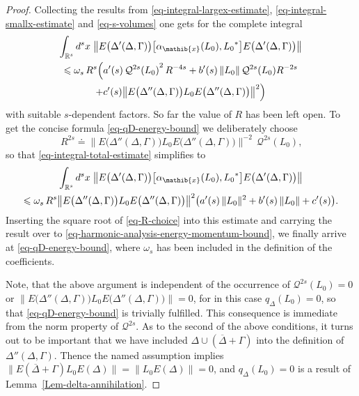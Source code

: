 \documentclass[11pt,twoside,openright]{report}
\theoremstyle{definition}
\theoremstyle{plain}
\theoremstyle{remark}
\theoremstyle{assumption}
\newcommand{\bcomm}[2]{\bigl[ #1 , #2 \bigr]}
\newcommand{\norm}[1]{\lVert #1 \rVert}
\newcommand{\bnorm}[1]{\bigl\lVert #1 \bigr\rVert}
\newcommand{\Qtwos}{\mathcal{Q}^{2 s}}
\newcommand{\Qtwosx}[1]{\mathcal{Q}^{2 s} ( #1 )}
\newcommand{\qDx}[1]{q_\Delta ( #1 )}
\newcommand{\Rs}{\mathbb{R}^s}
\newcommand{\Deltabar}{\overline{\Delta}}
\newcommand{\ED}{E ( \Delta )}
\newcommand{\EDG}{E \bigl( \Delta' ( \Delta , \Gamma ) \bigr)}
\newcommand{\EDdG}{E \bigl( \Delta'' ( \Delta , \Gamma ) \bigr)}
\newcommand{\EDGplus}{E ( \overline{\Delta} + \Gamma)}
\newcommand{\aibx}{\alpha_\mathib{x}}
\begin{document}
\begin{proof}
  Collecting the results from \eqref{eq-integral-largex-estimate},
  \eqref{eq-integral-smallx-estimate} and \eqref{eq-s-volumes} one
  gets for the complete integral
  \begin{multline}
    \label{eq-integral-total-estimate}
    \int_{\Rs} d^s x \; \bnorm{\EDG \bcomm{\aibx ( L_0 )}{{L_0}^*}
    \EDG} \\
    \leqslant \omega_s \, R^s \Bigl( a' ( s ) \, {\Qtwosx{L_0}}^2 \,
    R^{- 4 s} + b' ( s ) \, \norm{L_0} \, \Qtwosx{L_0} R^{- 2 s} \\
    + c' ( s ) \bnorm{\EDdG L_0 \EDdG}^2 \Bigr)
  \end{multline}
  with suitable $s$-dependent factors. So far the value of $R$ has
  been left open. To get the concise formula
  \eqref{eq-qD-energy-bound} we deliberately choose
  \begin{equation}
    \label{eq-R-choice}
    R^{2 s} \doteq \bnorm{\EDdG L_0 \EDdG}^{- 2} \, \Qtwosx{L_0}
    \text{,}
  \end{equation}
  so that \eqref{eq-integral-total-estimate} simplifies to
  \begin{multline}
    \label{eq-integral-total-estimate-R-chosen}
    \int_{\Rs} d^s x \; \bnorm{\EDG \bcomm{\aibx ( L_0 )}{{L_0}^*}
    \EDG} \\
    \leqslant \omega_s \, R^s \bnorm{\EDdG L_0 \EDdG}^2 \bigl( a' ( s
    ) \, \norm{L_0}^2 + b' ( s ) \, \norm{L_0} + c' ( s ) \bigr)
    \text{.}
  \end{multline}
  Inserting the square root of \eqref{eq-R-choice} into this estimate
  and carrying the result over to
  \eqref{eq-harmonic-analysis-energy-momentum-bound}, we finally
  arrive at \eqref{eq-qD-energy-bound}, where $\omega_s$ has been
  included in the definition of the coefficients.

  Note, that the above argument is independent of the occurrence of
  $\Qtwosx{L_0} = 0$ or $\bnorm{\EDdG L_0 \EDdG} = 0$, for in this
  case $\qDx{L_0} = 0$, so that \eqref{eq-qD-energy-bound} is
  trivially fulfilled. This consequence is immediate from the norm
  property of $\Qtwos$. As to the second of the above conditions, it
  turns out to be important that we have included $\Delta \cup (
  \Deltabar + \Gamma )$ into the definition of $\Delta'' ( \Delta ,
  \Gamma )$. Thence the named assumption implies $\bnorm{\EDGplus L_0
  \ED} = \bnorm{L_0 \ED} = 0$, and $\qDx{L_0} = 0$ is a result of
  Lemma~\ref{Lem-delta-annihilation}.
\end{proof}
\end{document}
